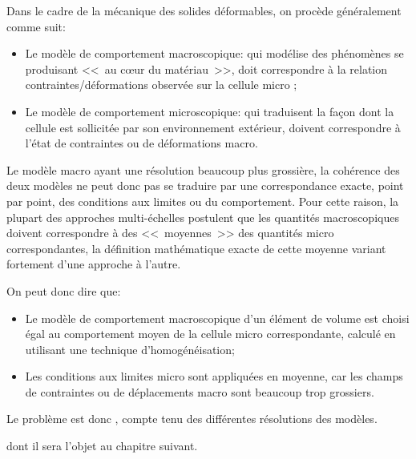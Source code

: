 Dans le cadre de la mécanique des solides déformables, on procède
généralement comme suit:
\begin{itemize}
  \item Le modèle de comportement macroscopique:
	qui modélise des phénomènes se produisant <<~au cœur du matériau~>>,
	doit correspondre à la relation contraintes/déformations observée sur la cellule micro ;

  \item Le modèle de comportement microscopique:
	qui traduisent la façon dont la cellule est sollicitée par son environnement
 	extérieur, doivent correspondre à l'état de contraintes ou de déformations macro.
\end{itemize}

Le modèle macro ayant une résolution beaucoup plus grossière, la cohérence des deux
modèles ne peut donc pas se traduire par une correspondance exacte, point par point, des
conditions aux limites ou du comportement. Pour cette raison, la plupart des approches
multi-échelles postulent que les quantités macroscopiques doivent correspondre à des
<<~moyennes~>> des quantités micro correspondantes, la définition mathématique exacte de
cette moyenne variant fortement d'une approche à l'autre.

\medskip
{} On peut donc dire que:
\begin{itemize}
  \item Le modèle de comportement macroscopique d'un élément de volume est choisi
	égal au comportement moyen de la cellule micro correspondante, calculé en utilisant
	une technique d'homogénéisation;

  \item Les conditions aux limites micro sont appliquées en moyenne, car les champs de
	contraintes ou de déplacements macro sont beaucoup trop grossiers.
\end{itemize}

\medskip
Le problème est donc , compte tenu des différentes résolutions des modèles.

\medskip
{} 
dont il sera l'objet au chapitre suivant.

\medskip
{}

